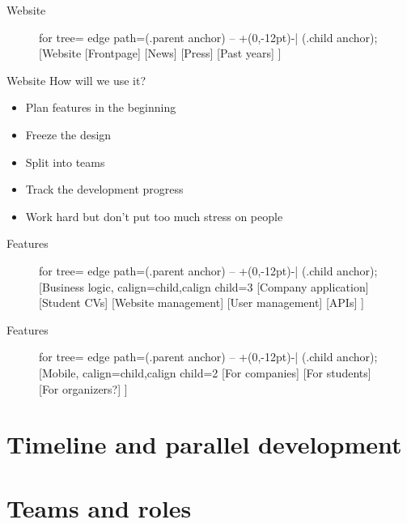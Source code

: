 \documentclass{beamer}
\begin{document}
	\begin{frame}{Website}
		\begin{figure}
			\begin{forest}
				for tree={%
					edge path={\noexpand{} (.parent anchor) -- +(0,-12pt)-| (.child anchor);}
				}
				[Website
					[Frontpage]
					[News]
					[Press]
					[Past years]
				]
			\end{forest}
		\end{figure}
	\end{frame}

	\begin{frame}{Website}
		How will we use it?
		\begin{itemize}
			\item Plan features in the beginning
			\item Freeze the design
			\item Split into teams
			\item Track the development progress
			\item Work hard but don't put too much stress on people
		\end{itemize}
	\end{frame}

	\begin{frame}{Features}
		\begin{figure}
			\begin{adjustbox}{width=\linewidth}
			\begin{forest}
				for tree={%
					edge path={\noexpand{} (.parent anchor) -- +(0,-12pt)-| (.child anchor)\forestoption{edge label};}
				}
				[Business logic, calign=child,calign child=3
					[Company application]
					[Student CVs]
					[Website management]
					[User management]
					[APIs]
				]
			\end{forest}
			\end{adjustbox}
		\end{figure}
	\end{frame}

	\begin{frame}{Features}
		\begin{figure}
			\begin{forest}
				for tree={%
					edge path={\noexpand{} (.parent anchor) -- +(0,-12pt)-| (.child anchor)\forestoption{edge label};}
				}
				[Mobile, calign=child,calign child=2
					[For companies]
					[For students]
					[For organizers?]
				]
			\end{forest}
		\end{figure}
	\end{frame}
	
	\section{Timeline and parallel development}
	
	\section{Teams and roles}
\end{document}
